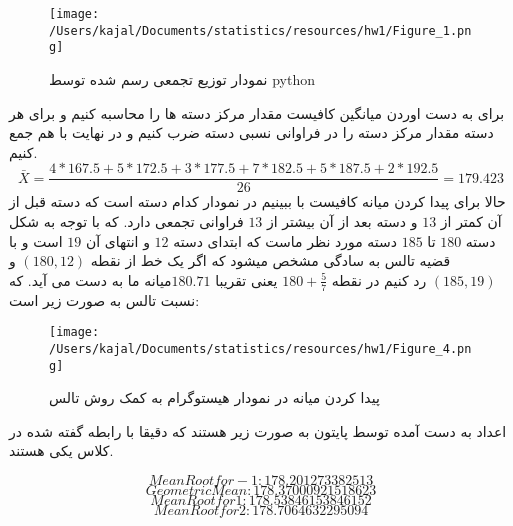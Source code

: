 \problem{}

\subproblem{}
\begin{figure}[H]
	\centering
	\texttt{[image: /Users/kajal/Documents/statistics/resources/hw1/Figure\_1.png]}
	\caption{نمودار توزیع تجمعی رسم شده توسط python}
\end{figure}

\subproblem{}
برای به دست اوردن میانگین کافیست مقدار مرکز دسته ها را محاسبه کنیم و برای هر دسته مقدار مرکز دسته را در فراوانی نسبی دسته
ضرب کنیم و در نهایت با هم جمع کنیم.
\newline
\newline
\[ \bar{X} = \frac{4 * 167.5 + 5 * 172.5 + 3 * 177.5 + 7 * 182.5 + 5 * 187.5 + 2 * 192.5}{26} = 179.423 \]
\newline
\newline
حالا برای پیدا کردن میانه کافیست با ببینیم در نمودار کدام دسته است که دسته قبل از آن کمتر از $13$ و دسته بعد از آن بیشتر از $13$ فراوانی تجمعی دارد.
که با توجه به شکل دسته $180$ تا $185$ دسته مورد نظر ماست که ابتدای دسته $12$ و انتهای آن $19$ است و با قضیه تالس به سادگی مشخص میشود که اگر یک خط از نقطه $(180,12)$ و $(185,19)$ رد کنیم
در نقطه $180 + \frac{5}{7}$ یعنی تقریبا $180.71 $میانه ما به دست می آید.
که نسبت تالس به صورت زیر است:\newline
\begin{figure}[H]
	\centering
	\texttt{[image: /Users/kajal/Documents/statistics/resources/hw1/Figure\_4.png]}
	\caption{پیدا کردن میانه در نمودار هیستوگرام به کمک روش تالس}
\end{figure}

\subproblem{}
اعداد به دست آمده توسط پایتون به صورت زیر هستند که دقیقا با رابطه گفته شده در کلاس
یکی هستند.

\[ Mean Root for -1: 178.201273382513\]
\[Geometric Mean: 178.37000921518623\]
\[Mean Root for 1: 178.53846153846152\]
\[Mean Root for 2: 178.7064632295094\]
